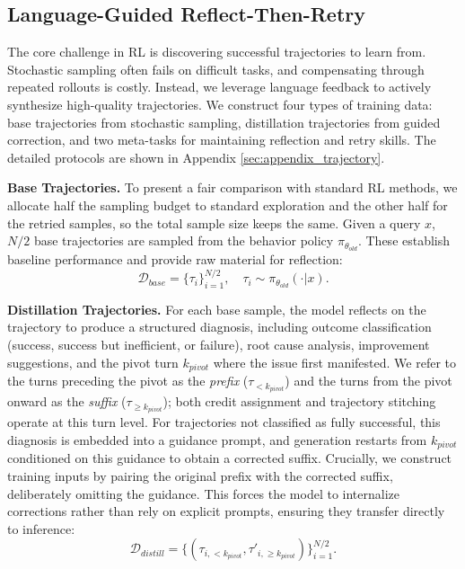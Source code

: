 \documentclass{article} %
\theoremstyle{definition}
\theoremstyle{remark}
\begin{document}
\subsection{Language-Guided Reflect-Then-Retry}
The core challenge in RL is discovering successful trajectories to learn from. Stochastic sampling often fails on difficult tasks, and compensating through repeated rollouts is costly. Instead, we leverage language feedback to actively synthesize high-quality trajectories. We construct four types of training data: base trajectories from stochastic sampling, distillation trajectories from guided correction, and two meta-tasks for maintaining reflection and retry skills. The detailed protocols are shown in Appendix \ref{sec:appendix_trajectory}.

\textbf{Base Trajectories.} To present a fair comparison with standard RL methods, we allocate half the sampling budget to standard exploration and the other half for the retried samples, so the total sample size keeps the same. Given a query $x$, $N/2$ base trajectories are sampled from the behavior policy $\pi_{\theta_{old}}$. These establish baseline performance and provide raw material for reflection:
\begin{equation}
    \mathcal{D}_{base} = \{\tau_i\}_{i=1}^{N/2}, \quad \tau_i \sim \pi_{\theta_{old}}(\cdot | x).
\end{equation}

\textbf{Distillation Trajectories.} For each base sample, the model reflects on the trajectory to produce a structured diagnosis, including outcome classification (success, success but inefficient, or failure), root cause analysis, improvement suggestions, and the pivot turn $k_{pivot}$ where the issue first manifested. We refer to the turns preceding the pivot as the \emph{prefix} ($\tau_{<k_{pivot}}$) and the turns from the pivot onward as the \emph{suffix} ($\tau_{\geq k_{pivot}}$); both credit assignment and trajectory stitching operate at this turn level. For trajectories not classified as fully successful, this diagnosis is embedded into a guidance prompt, and generation restarts from $k_{pivot}$ conditioned on this guidance to obtain a corrected suffix. Crucially, we construct training inputs by pairing the original prefix with the corrected suffix, deliberately omitting the guidance. This forces the model to internalize corrections rather than rely on explicit prompts, ensuring they transfer directly to inference:
\begin{equation}
    \mathcal{D}_{distill} = \{(\tau_{i,<k_{pivot}}, \tau'_{i,\geq k_{pivot}})\}_{i=1}^{N/2}.
\end{equation}
\end{document}
